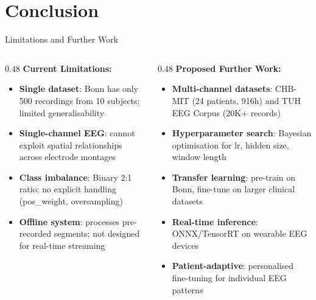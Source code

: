 \documentclass[aspectratio=169,12pt]{beamer}
\begin{document}
\section{Conclusion}

\begin{frame}{Limitations and Further Work}
\begin{columns}[T]
\begin{column}{0.48\textwidth}
\textbf{Current Limitations:}
\begin{itemize}\small\itemsep2pt
    \item \textbf{Single dataset}: Bonn has only 500 recordings from 10 subjects; limited generalisability
    \item \textbf{Single-channel EEG}: cannot exploit spatial relationships across electrode montages
    \item \textbf{Class imbalance}: Binary 2:1 ratio; no explicit handling (pos\_weight, oversampling)
    \item \textbf{Offline system}: processes pre-recorded segments; not designed for real-time streaming
\end{itemize}
\end{column}
\begin{column}{0.48\textwidth}
\textbf{Proposed Further Work:}
\begin{itemize}\small\itemsep2pt
    \item \textbf{Multi-channel datasets}: CHB-MIT (24 patients, 916h) and TUH EEG Corpus (20K+ records)
    \item \textbf{Hyperparameter search}: Bayesian optimisation for lr, hidden size, window length
    \item \textbf{Transfer learning}: pre-train on Bonn, fine-tune on larger clinical datasets
    \item \textbf{Real-time inference}: ONNX/TensorRT on wearable EEG devices
    \item \textbf{Patient-adaptive}: personalised fine-tuning for individual EEG patterns
\end{itemize}
\end{column}
\end{columns}
\end{frame}
\end{document}
